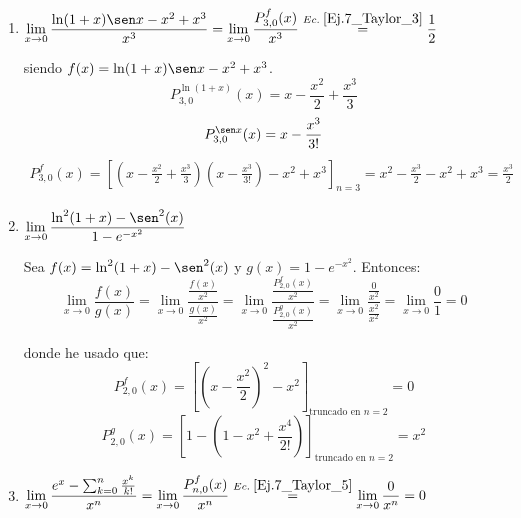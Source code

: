 \begin{ejercicio}
\begin{enumerate}
        \item $\displaystyle \lim_{x\to 0} \frac{\ln(1+x)\sen x - x^2+x^3}{x^3} = \lim_{x\to 0} \frac{P_{3,0}^f(x)}{x^3} \stackrel{Ec.\;\ref{Ej.7_Taylor_3}}{=}\frac{1}{2}$
        
        siendo $f(x) = \ln(1+x)\sen x - x^2+x^3$.
        \begin{equation*}
            P_{3,0}^{\ln (1+x)}(x) = x - \frac{x^2}{2} + \frac{x^3}{3}
        \end{equation*}
        \begin{equation*}
            P_{3,0}^{\sen x}(x) = x - \frac{x^3}{3!}
        \end{equation*}
        \begin{multline}\label{Ej.7_Taylor_3}
            P_{3,0}^{f}(x) = \left[\left( x - \frac{x^2}{2} + \frac{x^3}{3} \right)\left(x - \frac{x^3}{3!} \right) - x^2 + x^3\right]_{n=3}
            = x^2 - \frac{x^3}{2} - x^2 + x^3 = \frac{x^3}{2}
        \end{multline}

        \item $\displaystyle \lim_{x\to 0} \frac{\ln^2(1+x)-\sen^2(x)}{1-e^{-x^2}}$

        Sea $f(x) = \ln^2(1+x)-\sen^2(x)$ y $g(x) = 1-e^{-x^2}$. Entonces:
        \begin{equation*}
            \lim_{x\to 0} \frac{f(x)}{g(x)} = \lim_{x\to 0} \frac{\frac{f(x)}{x^2}}{\frac{g(x)}{x^2}}
            = \lim_{x\to 0} \frac{\frac{P_{2, 0}^f(x)}{x^2}}{\frac{P_{2, 0}^g(x)}{x^2}}
            = \lim_{x\to 0} \frac{\frac{0}{x^2}}{\frac{x^2}{x^2}}
            = \lim_{x\to 0} \frac{0}{1} = 0
        \end{equation*}

        donde he usado que:
        \begin{equation*}
            P_{2, 0}^f(x) = \left[\left(x-\frac{x^2}{2}\right)^2 - x^2 \right]_{\text{truncado en } n=2} = 0
        \end{equation*}
        \begin{equation*}
            P_{2, 0}^g(x) = \left[1-\left( 1 - x^2 + \frac{x^4}{2!} \right) \right]_{\text{truncado en } n=2} = x^2
        \end{equation*}

        \item $\displaystyle \lim_{x\to 0} \frac{e^x - \sum_{k=0}^n \frac{x^k}{k!}}{x^n} = \lim_{x\to 0} \frac{P_{n,0}^f(x)}{x^n} \stackrel{Ec.\;\ref{Ej.7_Taylor_5}}{=} \lim_{x\to 0} \frac{0}{x^n} = 0$
        

\end{enumerate}
\end{ejercicio}
